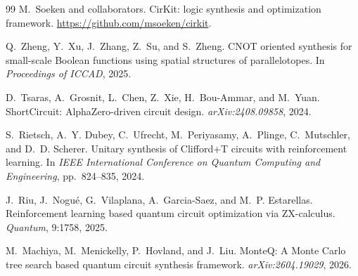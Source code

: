 \documentclass[UTF8,fontset=macnew,11pt]{ctexart}
\begin{document}
\begin{thebibliography}{99}
M.~Soeken and collaborators.
\newblock CirKit: logic synthesis and optimization framework.
\newblock \url{https://github.com/msoeken/cirkit}.

Q.~Zheng, Y.~Xu, J.~Zhang, Z.~Su, and S.~Zheng.
\newblock CNOT oriented synthesis for small-scale Boolean functions using spatial structures of parallelotopes.
\newblock In \emph{Proceedings of ICCAD}, 2025.

D.~Tsaras, A.~Grosnit, L.~Chen, Z.~Xie, H.~Bou-Ammar, and M.~Yuan.
\newblock ShortCircuit: AlphaZero-driven circuit design.
\newblock \emph{arXiv:2408.09858}, 2024.

S.~Rietsch, A.~Y. Dubey, C.~Ufrecht, M.~Periyasamy, A.~Plinge, C.~Mutschler, and D.~D. Scherer.
\newblock Unitary synthesis of Clifford+T circuits with reinforcement learning.
\newblock In \emph{IEEE International Conference on Quantum Computing and Engineering}, pp.~824--835, 2024.

J.~Riu, J.~Nogu{\'e}, G.~Vilaplana, A.~Garcia-Saez, and M.~P. Estarellas.
\newblock Reinforcement learning based quantum circuit optimization via ZX-calculus.
\newblock \emph{Quantum}, 9:1758, 2025.

M.~Machiya, M.~Menickelly, P.~Hovland, and J.~Liu.
\newblock MonteQ: A Monte Carlo tree search based quantum circuit synthesis framework.
\newblock \emph{arXiv:2604.19029}, 2026.

\end{thebibliography}
\end{document}
